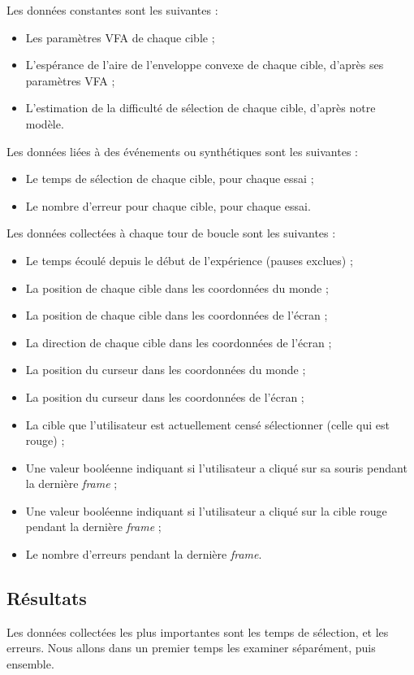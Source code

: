 	Les données constantes sont les suivantes :
	
	\begin{itemize}
		\item Les paramètres VFA de chaque cible ;
		\item L'espérance de l'aire de l'enveloppe convexe de chaque cible, d'après ses paramètres VFA ;
		\item L'estimation de la difficulté de sélection de chaque cible, d'après notre modèle.
	\end{itemize}
	
	Les données liées à des événements ou synthétiques sont les suivantes :
	
	\begin{itemize}
		\item Le temps de sélection de chaque cible, pour chaque essai ;
		\item Le nombre d'erreur pour chaque cible, pour chaque essai.
	\end{itemize}
	
	Les données collectées à chaque tour de boucle sont les suivantes :
	
	\begin{itemize}
		\item Le temps écoulé depuis le début de l'expérience (pauses exclues) ;
		\item La position de chaque cible dans les coordonnées du monde ;
		\item La position de chaque cible dans les coordonnées de l'écran ;
		\item La direction de chaque cible dans les coordonnées de l'écran ;
		\item La position du curseur dans les coordonnées du monde ;
		\item La position du curseur dans les coordonnées de l'écran ;
		\item La cible que l'utilisateur est actuellement censé sélectionner (celle qui est rouge) ;
		\item Une valeur booléenne indiquant si l'utilisateur a cliqué sur sa souris pendant la dernière \emph{frame} ;
		\item Une valeur booléenne indiquant si l'utilisateur a cliqué sur la cible rouge pendant la dernière \emph{frame} ;
		\item Le nombre d'erreurs pendant la dernière \emph{frame}.
	\end{itemize}
	
	\subsection{Résultats}
	\label{sub:as_res}
	Les données collectées les plus importantes sont les temps de sélection, et les erreurs. Nous allons dans un premier temps les examiner séparément, puis ensemble.
	
